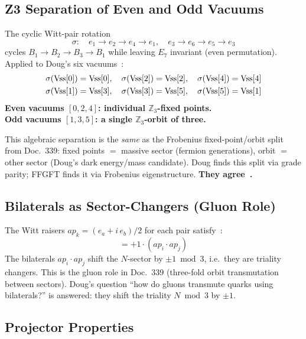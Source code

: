 \subsection{Z3 Separation of Even and Odd Vacuums}

The cyclic Witt-pair rotation
\begin{equation}
  \sigma:\quad e_1{\to}e_2{\to}e_4{\to}e_1,\quad e_3{\to}e_6{\to}e_5{\to}e_3
\end{equation}
cycles $B_1 \to B_2 \to B_3 \to B_1$ while leaving $E_7$ invariant
(even permutation). Applied to Doug's six vacuums~\BM:
\begin{align}
  &\sigma(\text{Vss}[0]) = \text{Vss}[0],\quad
   \sigma(\text{Vss}[2]) = \text{Vss}[2],\quad
   \sigma(\text{Vss}[4]) = \text{Vss}[4] \notag\\
  &\sigma(\text{Vss}[1]) = \text{Vss}[3],\quad
   \sigma(\text{Vss}[3]) = \text{Vss}[5],\quad
   \sigma(\text{Vss}[5]) = \text{Vss}[1]
\end{align}
\textbf{Even vacuums $[0,2,4]$: individual $\mathbb{Z}_3$-fixed points.}\\
\textbf{Odd vacuums $[1,3,5]$: a single $\mathbb{Z}_3$-orbit of three.}

This algebraic separation is the \emph{same} as the Frobenius fixed-point/orbit
split from Doc.~339: fixed points $=$ massive sector (fermion generations),
orbit $=$ other sector (Doug's dark energy/mass candidate).
Doug finds this split via grade parity; FFGFT finds it via Frobenius eigenstructure.
\textbf{They agree~\BM.}

\subsection{Bilaterals as Sector-Changers (Gluon Role)}

The Witt raisers $ap_k = (e_a + i\,e_b)/2$ for each pair satisfy~\BM:
\begin{equation}
  [N,\; ap_i \cdot ap_j] = +1 \cdot (ap_i \cdot ap_j)
\end{equation}
The bilaterals $ap_i \cdot ap_j$ shift the $N$-sector by $\pm 1 \bmod 3$,
i.e.\ they are triality changers. This is the gluon role in Doc.~339
(three-fold orbit transmutation between sectors). Doug's question
``how do gluons transmute quarks using bilaterals?'' is answered:
they shift the triality $N \bmod 3$ by $\pm 1$.

\subsection{Projector Properties}

